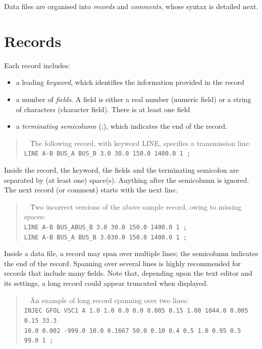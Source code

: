 Data files are organised into {\em records} and {\em comments}, whose syntax is detailed next.

\section{Records}

Each record includes:
\begin{itemize}
\item a leading {\em keyword}, which identifies the information provided in the record
\item a number of {\em fields}. A field is either a real number (numeric field) or a string of characters (character field). There is at least one field
\item a {\em terminating semicolumn} (;), which indicates the end of the record.
\end{itemize}

\begin{quote}
\begin{tabbing}
\faHandPointRight ~ \= \rm The following record, with keyword LINE, specifies a transmission line:\\
\> \tt LINE A-B BUS\_A BUS\_B  3.0 30.0 150.0 1400.0 1 ;
\end{tabbing}
\end{quote} 

Inside the record, the keyword, the fields and the terminating semicolon are separated by (at least one) space(s). Anything after the semicolumn is ignored. The next record (or comment) starts with the next line.

\begin{quote}
\begin{tabbing}
\faHandPointRight ~ \= \rm Two incorrect versions of the above sample record, owing to missing spaces:\\
\> \tt LINE A-B BUS\_ABUS\_B  3.0 30.0 150.0 1400.0 1 ;\\
\> \tt LINE A-B BUS\_A BUS\_B  3.030.0 150.0 1400.0 1 ;
\end{tabbing}
\end{quote} 

Inside a data file, a record may span over multiple lines; the semicolumn indicates the end of the record. Spanning over several lines is highly recommended for records that include many fields. Note that, depending upon the text editor and its settings, a long record could appear truncated when displayed.  

\begin{quote}
\begin{tabbing}
\faHandPointRight ~ \= \rm An example of long record spanning over two lines: \\
\> \tt INJEC GFOL VSC1 A 1.0 1.0 0.0 0.0 0.005 0.15 1.00 1044.0 0.005 0.15 33.3 \\
\> \tt  10.0 0.002 -999.0 10.0 0.1667 50.0 0.10  0.4  0.5  1.0  0.95  0.5 99.0 1 ;\\
\end{tabbing}
\end{quote} 

